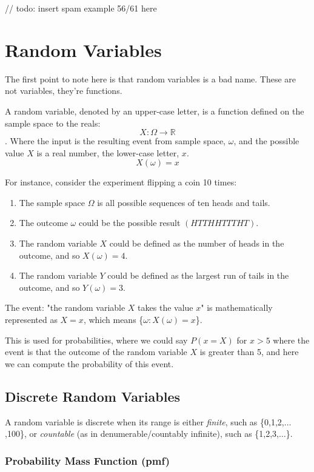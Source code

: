 \documentclass{report}
\begin{document}
// todo: insert spam example 56/61 here


\section{Random Variables}

The first point to note here is that random variables is a bad name. These are not variables, they're functions.

A random variable, denoted by an upper-case letter, is a function defined on the sample  space to the reals: $$X: \Omega \rightarrow \mathbb{R}$$. 
Where the input is the resulting event from sample space, $\omega$, and the possible value $X$ is a real number, the lower-case letter, $x$.
$$X(\omega) = x$$

For instance, consider the experiment flipping a coin 10 times:
\begin{enumerate}
\item The sample space $\Omega$ is all possible sequences of ten heads  and tails.
\item The outcome $\omega$ could be the possible result $(HTTHHTTTHT)$.
\item The random variable $X$ could be defined as the number of heads in the outcome, and so $X(\omega) = 4$.
\item The random variable $Y$  could be defined as the largest run of tails in the outcome, and so $Y(\omega) = 3$.
\end{enumerate}


The event: "the random variable $X$ takes the value $x$" is mathematically represented as $X=x$, which means \{$\omega: X(\omega) = x$\}. 

This is used for probabilities, where we could say $P(x = X)$ for $x>5$ where the event is that the outcome of the random variable $X$ is greater than 5, and here we can compute the probability of this event.

\subsection{Discrete Random Variables}

A random variable is discrete when its range is either \textit{finite}, such as \{0,1,2,$\dots$,100\}, or \textit{countable} (as in denumerable/countably infinite), such as \{1,2,3,$\dots$\}.

\subsubsection{Probability Mass Function (pmf)}
\end{document}
